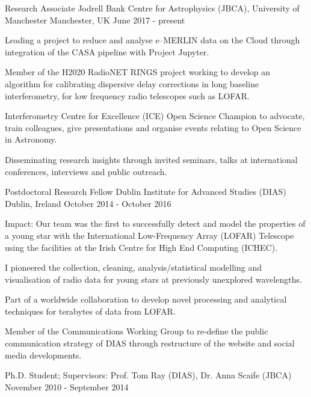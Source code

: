 \begin{cventries}
  \cventry
    {Research Associate}
    {Jodrell Bank Centre for Astrophysics (JBCA), University of Manchester}
    {Manchester, UK}
    {June 2017 - present}
    {
      \begin{cvitems}
        \item {Leading a project to reduce and analyse e--MERLIN data on the Cloud through integration of the CASA pipeline with Project Jupyter.}
        \item {Member of the H2020 RadioNET RINGS project working to develop an algorithm for calibrating dispersive delay corrections in long baseline interferometry, for low frequency radio telescopes such as LOFAR.}
        \item {Interferometry Centre for Excellence (ICE) Open Science Champion to advocate, train colleagues, give presentations and organise events relating to Open Science in Astronomy.}
        \item {Disseminating research insights through invited seminars, talks at international conferences, interviews and public outreach.}
      \end{cvitems}
    }
\cventry
    {Postdoctoral Research Fellow}
    {Dublin Institute for Advanced Studies (DIAS)}
    {Dublin, Ireland}
    {October 2014 - October 2016}
    {
      \begin{cvitems}
        \item{Impact: Our team was the first to successfully detect and model the properties of a young star with the International Low-Frequency Array (LOFAR) Telescope using the facilities at the Irish Centre for High End Computing (ICHEC).}        
        \item {I pioneered the collection, cleaning, analysis/statistical modelling and visualisation of radio data for young stars at previously unexplored wavelengths.}
        \item {Part of a worldwide collaboration to develop novel processing and analytical techniques for terabytes of data from LOFAR.}
        \item {Member of the Communications Working Group to re-define the public communication strategy of DIAS through restructure of the website and social media developments.}
      \end{cvitems}
    }
  \cventry
    {Ph.D. Student; Supervisors: Prof. Tom Ray (DIAS), Dr. Anna Scaife (JBCA)}
    {}
    {}
    {November 2010 - September 2014}
    {
      \begin{cvitems}

\end{cvitems}}
\end{cventries}
